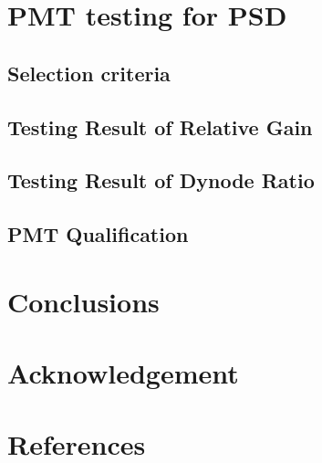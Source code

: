 \documentclass[5p, times]{elsarticle}
\begin{document}
\section{PMT testing for PSD}
\label{sec:pmt_test}

\subsection{Selection criteria}
\label{sec:selection}

\subsection{Testing Result of Relative Gain}
\label{sec:relative_gain}

\subsection{Testing Result of Dynode Ratio}
\label{sec:dynode_ratio}

\subsection{PMT Qualification}
\label{sec:qualification}

\section{Conclusions}
\label{sec:conclustions}

\section*{Acknowledgement}

\appendix
\section{}
\label{app:}

\section*{References}

\end{document}
